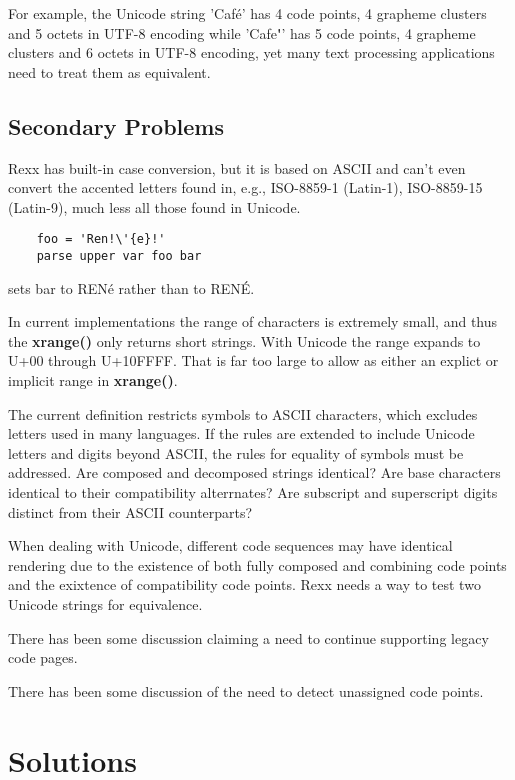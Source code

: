 \documentclass[b4paper]{article}
\begin{document}
For example, the Unicode string 'Caf\'{e}' has 4 code points, 4
grapheme clusters and 5 octets in UTF-8 encoding while
'Cafe\textbf{\'{ }}' has 5 code points, 4 grapheme clusters and 6 octets
in UTF-8 encoding, yet many text processing applications need to treat
them as equivalent.

\subsection{Secondary Problems}
Rexx has built-in case conversion, but it is based on ASCII and
can't even convert the accented letters found in, e.g., ISO-8859-1
(Latin-1), ISO-8859-15 (Latin-9), much less all those found in Unicode.

\begin{lstlisting}
    foo = 'Ren!\'{e}!'
    parse upper var foo bar
\end{lstlisting}

sets bar to REN\'{e} rather than to REN\'{E}.

In current implementations the range of characters is extremely small,
and thus the \textbf{xrange()} only returns short strings.
With Unicode the range expands to U+00 through U+10FFFF.
That is far too large to allow as either an explict or implicit range in \textbf{xrange()}.

The current definition restricts symbols to ASCII characters,
which excludes letters used in many languages. If the rules are extended to include
Unicode letters and digits beyond ASCII, the rules for equality of symbols must be addressed.
Are composed and decomposed strings identical?
Are base characters identical to their compatibility alterrnates?
Are subscript and superscript digits distinct from their ASCII
counterparts?

When dealing with Unicode, different code sequences may have identical
rendering due to the existence of both fully composed and combining
code points and the exixtence of compatibility code points.
Rexx needs a way to test two Unicode strings for equivalence.

There has been some discussion claiming a need to continue supporting legacy code pages.

There has been some discussion of the need to detect unassigned code points.


\section{Solutions}
\end{document}
